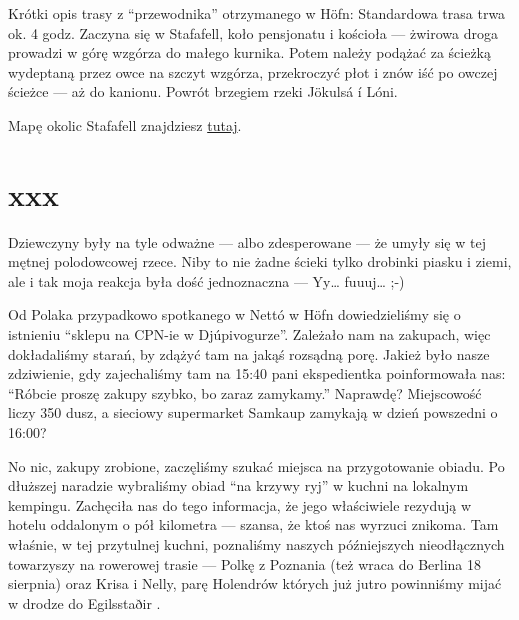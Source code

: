 

Krótki opis trasy z “przewodnika” otrzymanego w Höfn: Standardowa trasa trwa ok. 4 godz. Zaczyna się w Stafafell, koło pensjonatu i kościoła --- żwirowa droga prowadzi w górę wzgórza do małego kurnika. Potem należy podążać za ścieżką wydeptaną przez owce na szczyt wzgórza, przekroczyć płot i znów iść po owczej ścieżce --- aż do kanionu. Powrót brzegiem rzeki Jökulsá í Lóni.

Mapę okolic Stafafell znajdziesz \href{http://www.stafafell.is/uploads/8/3/3/1/8331287/5674623_orig.jpg}{tutaj}.

\section*{xxx}

Dziewczyny były na tyle odważne --- albo zdesperowane --- że umyły się w tej mętnej polodowcowej rzece. Niby to nie żadne ścieki tylko drobinki piasku i ziemi, ale i tak moja reakcja była dość jednoznaczna --- Yy… fuuuj… ;-)

Od Polaka przypadkowo spotkanego w Nettó w Höfn dowiedzieliśmy się o istnieniu “sklepu na CPN-ie w Djúpivogurze”. Zależało nam na zakupach, więc dokładaliśmy starań, by zdążyć tam na jakąś rozsądną porę. Jakież było nasze zdziwienie, gdy zajechaliśmy tam na 15:40 pani ekspedientka poinformowała nas: “Róbcie proszę zakupy szybko, bo zaraz zamykamy.” Naprawdę? Miejscowość liczy 350 dusz, a sieciowy supermarket Samkaup zamykają w dzień powszedni o 16:00?



No nic, zakupy zrobione, zaczęliśmy szukać miejsca na przygotowanie obiadu. Po dłuższej naradzie wybraliśmy obiad “na krzywy ryj” w kuchni na lokalnym kempingu. Zachęciła nas do tego informacja, że jego właściwiele rezydują w hotelu oddalonym o pół kilometra --- szansa, że ktoś nas wyrzuci znikoma. Tam właśnie, w tej przytulnej kuchni, poznaliśmy naszych późniejszych nieodłącznych towarzyszy na rowerowej trasie --- Polkę z Poznania (też wraca do Berlina 18 sierpnia) oraz Krisa i Nelly, parę Holendrów których już jutro powinniśmy mijać w drodze do Egilsstaðir .

